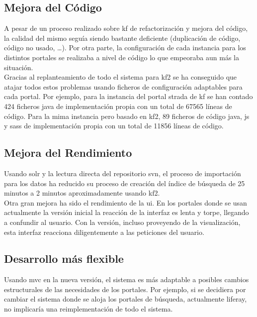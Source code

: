 \subsection{Mejora del Código}
A pesar de un proceso realizado sobre \gls{kf} de refactorización y mejora del código, la calidad del mismo seguía siendo bastante deficiente (duplicación de código, código no usado, \dots). Por otra parte, la configuración de cada instancia para los distintos portales se realizaba a nivel de código lo que empeoraba aun más la situación.\\

Gracias al replanteamiento de todo el sistema para \gls{kf2} se ha conseguido que atajar todos estos problemas usando ficheros de configuración adaptables para cada portal. Por ejemplo, para la instancia del portal \gls{strada} de \gls{kf} se han contado 424 ficheros \gls{java} de implementación propia con un total de 67565 líneas de código. Para la mima instancia pero basado en \gls{kf2}, 89 ficheros de código \gls{java}, \gls{js} y \gls{sass} de implementación propia con un total de 11856 líneas de código.
 

\subsection{Mejora del Rendimiento}
Usando \gls{solr} y la lectura directa del repositorio \gls{svn}, el proceso de importación para los datos ha reducido su proceso de creación del índice de búsqueda de 25 minutos a 2 minutos aproximadamente usando \gls{kf2}.\\

Otra gran mejora ha sido el rendimiento de la \gls{ui}. En los portales donde se usan actualmente la versión inicial la reacción de la interfaz es lenta y torpe, llegando a confundir al usuario. Con la versión, incluso proveyendo de la visualización, esta interfaz  reacciona diligentemente a las peticiones del usuario.\\

\subsection{Desarrollo más flexible}
Usando \gls{mvc} en la nueva versión, el sistema es más adaptable a posibles cambios estructurales de las necesidades de los portales. Por ejemplo, si se decidiera por cambiar el sistema donde se aloja los portales de búsqueda, actualmente \gls{liferay}, no implicaría una reimplementación de todo el sistema.

